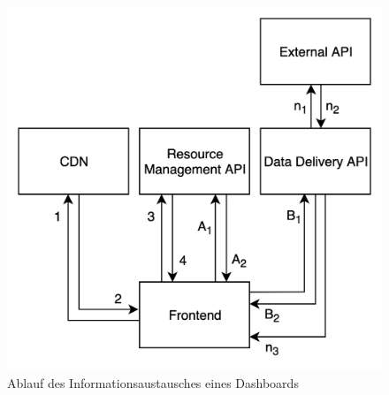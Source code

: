 \begin{figure}
    \label{figure:informationsaustauschdashboard}
    \begin{center}
    \includegraphics[scale=0.2]{img/abbildungen/InformationsaustauschDashboard}
    \end{center}
    \caption{Ablauf des Informationsaustausches eines Dashboards}
\end{figure}

